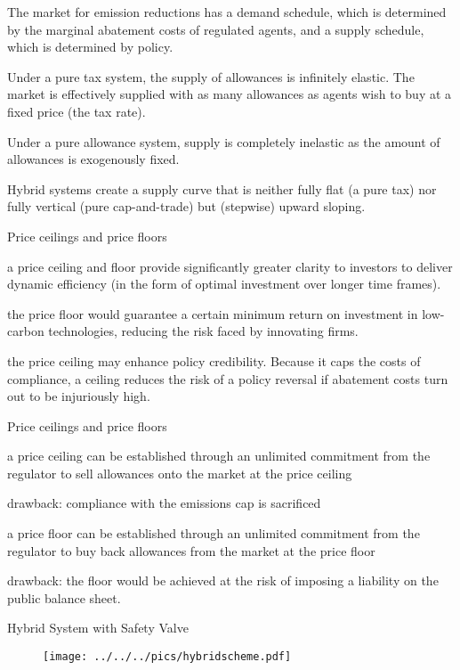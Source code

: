 	The market for emission
reductions has a demand schedule, which is determined by the marginal abatement costs of
regulated agents, and a supply schedule, which is determined by policy.

	Under a pure tax
system, the supply of allowances is infinitely elastic. The market is effectively supplied with as
many allowances as agents wish to buy at a fixed price (the tax rate).

	Under a pure allowance
system, supply is completely inelastic as the amount of allowances is exogenously fixed.

	Hybrid systems create a supply curve that is neither fully flat (a pure tax) nor fully vertical
(pure cap-and-trade) but (stepwise) upward sloping.


{Price ceilings and price floors}


	a price ceiling and floor provide significantly
greater clarity to investors to deliver dynamic efficiency (in the form of optimal investment
over longer time frames).

	the price floor would guarantee a certain minimum return on
investment in low-carbon technologies, reducing the risk faced by innovating firms.

	the price ceiling may enhance policy credibility. Because it caps the costs of
compliance, a ceiling reduces the risk of a policy reversal if abatement costs turn out to be
injuriously high.


{Price ceilings and price floors}


	a price ceiling can be established through an unlimited commitment from the regulator to sell allowances onto the market at the price ceiling

	drawback: compliance with the emissions cap is sacrificed

	a price floor can be established
through an unlimited commitment from the regulator to buy back
allowances from the market at the price floor

	drawback: the floor would be achieved at the risk of
imposing a liability on the public balance sheet.


{Hybrid System with Safety Valve}

\begin{center}
\begin{figure}[h!]
\centering
\texttt{[image: ../../../pics/hybridscheme.pdf]}
\end{figure}
\end{center}

